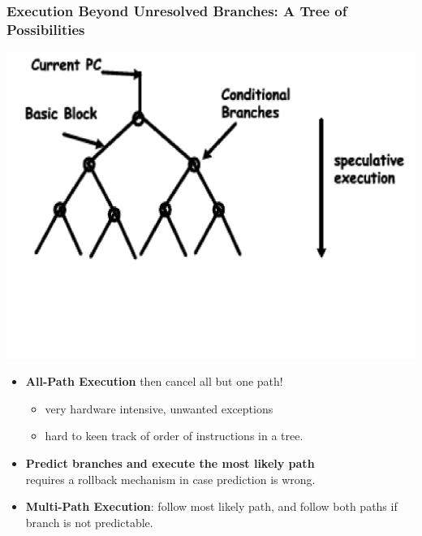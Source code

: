\documentclass{beamer}
\newcommand{\emp}[1]{\textcolor{DikuRed}{ #1}}
\begin{document}
\begin{frame}[fragile,t]
\frametitle{Execution Beyond Unresolved Branches: A Tree of Possibilities}

\includegraphics[width=44ex]{FigsOoOProc/CondBranch.pdf}
\vspace{-11ex}


\begin{itemize}
    \item \emp{\bf All-Path Execution} then cancel all but one path!
        \begin{itemize}
            \item very hardware intensive, unwanted exceptions
            \item hard to keen track of order of instructions in a tree.
        \end{itemize}\smallskip 
    \item \emp{\bf Predict branches and execute the most likely path}\\
            requires a rollback mechanism in case prediction is wrong.\medskip
    \item \emp{\bf Multi-Path Execution}: follow most likely path,
            and follow both paths if branch is not predictable.
\end{itemize}
\end{frame}
\end{document}
